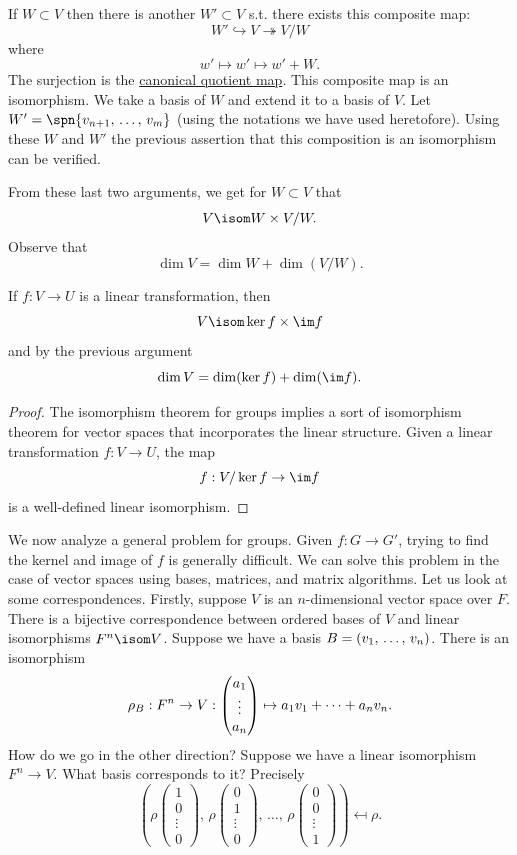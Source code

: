 \documentclass[11pt, oneside]{amsart}
\numberwithin{equation}{section}
\numberwithin{theorem}{section}
\theoremstyle{definition}
\let\bar\relax
\let\bf\relax
\def\0{\mathbf{0}}
\begin{document}
If $W\subset V$ then there is another $W'\subset V$ s.t. there exists this composite map:
$$
W' \hookrightarrow V \twoheadrightarrow V/W
$$ 
where
$$
w' \mapsto w'\mapsto w'+W.
$$
The surjection is the \underline{canonical quotient map}. This composite map is an isomorphism. We take a basis of $W$ and extend it to a basis of $V$. Let $W' =\spn\{\bf{v}_{n+1},\,\hdots,\, \bf{v}_m\}$ (using the notations we have used heretofore). Using these $W$ and $W'$ the previous assertion that this composition is an isomorphism can be verified.

From these last two arguments, we get for $W\subset V$ that 
$$
V \isom W \times V/W.
$$
Observe that 
$$
\dim V = \dim W + \dim (V/W).
$$

If $f: V \to U$ is a linear transformation, then
$$
V \isom \ker f \times \im f
$$
and by the previous argument
$$
\dim V =  \dim(\ker f) +\dim (\im f).
$$
\begin{proof}
The isomorphism theorem for groups implies a sort of isomorphism theorem for vector spaces that incorporates the linear structure. Given a linear transformation $f:V\to U$, the map $$\bar{f}: V/\ker f \to \im f$$ is a well-defined linear isomorphism.
\end{proof}

We now analyze a general problem for groups. Given $f : G\to G'$, trying to find the kernel and image of $f$ is generally difficult. We can solve this problem in the case of vector spaces using bases, matrices, and matrix algorithms. Let us look at some correspondences.
Firstly, suppose $V$ is an $n$-dimensional vector space over $F$. There is a bijective correspondence between ordered bases of $V$ and linear isomorphisms $F^n \isom V$. Suppose we have a basis $B = (\bf{v}_1,\,\hdots,\, \bf{v}_n)$. There is an isomorphism 
$$
\rho_B : F^n\to V : \left(\begin{matrix}a_{1} \\\vdots \\a_{n}\end{matrix}\right) \mapsto a_1\bf{v}_1 + \cdots + a_n\bf{v}_n. 
$$
How do we go in the other direction? Suppose we have a linear isomorphism $F^n\to V$. What basis corresponds to it? Precisely
$$
\left(\rho \left(\begin{matrix}1\\0\\\vdots\\0\end{matrix}\right), \,\rho \left(\begin{matrix}0\\1\\\vdots\\0\end{matrix}\right),\, \hdots ,\,\rho \left(\begin{matrix}0\\0\\\vdots\\1\end{matrix}\right)\right) \mapsfrom \rho.
$$
\end{document}
